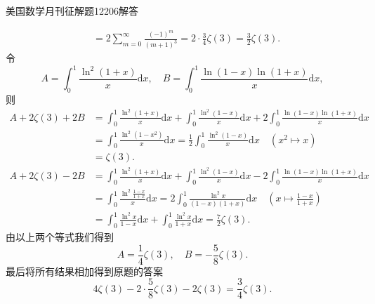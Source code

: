 \documentclass[UTF8,no-math,12pt,openany,table,dvipsnames,svgnames]{book}
\newcommand{\hei}{\CJKfamily{hei}}
\newenvironment{Proof}{\par\indent{\hei 证明}\hspace{1em}}{\par}
\begin{document}
\begin{MYBOX}[colbacktitle=blue]{美国数学月刊征解题12206解答}
\begin{Proof}
\begin{align*}
      & = 2\sum_{m=0}^\infty \frac{(-1)^m}{(m+1)^3}
        = 2 \cdot\frac34\zeta(3) = \frac32\zeta(3).
    \end{align*}
    令
    \[
      A = \int_0^1\frac{\ln^2(1+x)}x\mathrm dx,\quad
      B = \int_0^1\frac{\ln(1-x)\ln(1+x)}x\mathrm dx,
    \]
    则
    \begin{align*}
      A+2\zeta(3)+2B & = \int_0^1\frac{\ln^2(1+x)}x\mathrm dx + \int_0^1\frac{\ln^2(1-x)}x\mathrm dx +
      2\int_0^1\frac{\ln(1-x)\ln(1+x)}x\mathrm dx \\
      & = \int_0^1\frac{\ln^2(1-x^2)}x\mathrm dx
        = \frac12\int_0^1\frac{\ln^2(1-x)}x\mathrm dx
          \quad (x^2 \mapsto x)  \\
      & = \zeta(3).\\
      A+2\zeta(3)-2B & = \int_0^1\frac{\ln^2(1+x)}x\mathrm dx + \int_0^1\frac{\ln^2(1-x)}x\mathrm dx -
      2\int_0^1\frac{\ln(1-x)\ln(1+x)}x\mathrm dx\\
      & = \int_0^1\frac{\ln^2 \frac{1-x}{1+x} }x\mathrm dx = 2 \int_0^1\frac{\ln^2x}{(1-x)(1+x)}\mathrm dx
      \quad (x\mapsto\frac{1-x}{1+x})\\
      & = \int_0^1\frac{\ln^2x}{1-x}\mathrm dx + \int_0^1 \frac{\ln^2x}{1+x}\mathrm dx = \frac72\zeta(3).
    \end{align*}
    由以上两个等式我们得到
    \[ A=\frac14\zeta(3),\quad B = -\frac58\zeta(3). \]
    最后将所有结果相加得到原题的答案
    \[
      4\zeta(3) - 2\cdot \frac58\zeta(3) - 2\zeta(3) = \frac34\zeta(3).
    \]
\end{Proof}


\end{MYBOX}
\end{document}
